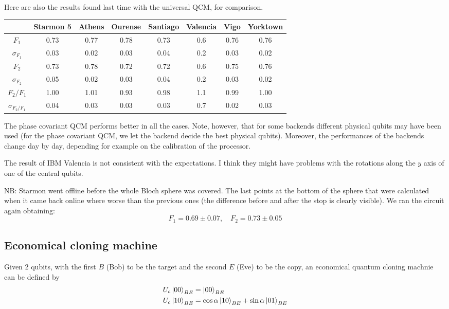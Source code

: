 \documentclass[11pt]{article}
\begin{document}
Here are also the results found last time with the universal QCM, for comparison.
\begin{table}[H]
    \centering
    \begin{tabular}{|c|c|c|c|c|c|c|c|}
    \hline
    \textbf{} & \textbf{Starmon 5} & \textbf{Athens} & \textbf{Ourense} & \textbf{Santiago} & \textbf{Valencia} & \textbf{Vigo} & \textbf{Yorktown} \\ \hline
    $F_1$              & 0.73 & 0.77 & 0.78 & 0.73 & 0.6 & 0.76 & 0.76 \\ \hline
    $\sigma_{F_1}$     & 0.03 & 0.02 & 0.03 & 0.04 & 0.2 & 0.03 & 0.02 \\ \hline
    $F_2$              & 0.73 & 0.78 & 0.72 & 0.72 & 0.6 & 0.75 & 0.76 \\ \hline
    $\sigma_{F_2}$     & 0.05 & 0.02 & 0.03 & 0.04 & 0.2 & 0.03 & 0.02 \\ \hline
    $F_2/F_1$          & 1.00 & 1.01 & 0.93 & 0.98 & 1.1 & 0.99 & 1.00 \\ \hline
    $\sigma_{F_2/F_1}$ & 0.04 & 0.03 & 0.03 & 0.03 & 0.7 & 0.02 & 0.03 \\ \hline
    \end{tabular}
\end{table}

The phase covariant QCM performs better in all the cases.
Note, however, that for some backends different physical qubits may have been used (for the phase covariant QCM, we let the backend decide the best physical qubits).
Moreover, the performances of the backends change day by day, depending for example on the calibration of the processor.

The result of IBM Valencia is not consistent with the expectations. I think they might have problems with the rotations along the $y$ axis of one of the central qubits.

NB: Starmon went offline before the whole Bloch sphere was covered. 
The last points at the bottom of the sphere that were calculated when it came back online where worse than the previous ones (the difference before and after the stop is clearly visible).
We ran the circuit again obtaining:
\[
    F_1=0.69 \pm 0.07, \quad F_2=0.73 \pm 0.05
\]
\subsection{Economical cloning machine}
Given 2 qubits, with the first $B$ (Bob) to be the target and the second $E$ (Eve) to be the copy, an economical quantum cloning machnie can be defined by 
\begin{align*}
    &U_{c}\ket{00}_{BE}=\ket{00}_{BE}\\
    &U_{c}\ket{10}_{BE}=\cos\alpha\ket{10}_{BE}+\sin\alpha\ket{01}_{BE} 
\end{align*}
\end{document}
